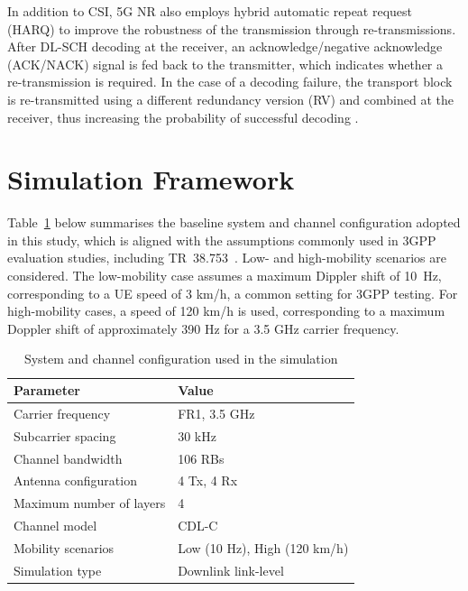 \documentclass[a4paper,12pt,onecolumn]{article}
\begin{document}
	In addition to CSI, 5G NR also employs hybrid automatic repeat request (HARQ) to improve the robustness of the transmission through re-transmissions. After DL-SCH decoding at the receiver, an acknowledge/negative acknowledge (ACK/NACK) signal is fed back to the transmitter, which indicates whether a re-transmission is required. In the case of a decoding failure, the transport block is re-transmitted using a different redundancy version (RV) and combined at the receiver, thus increasing the probability of successful decoding \cite{EricssonBook} \cite{MathWorks2026}.
	
	\section{Simulation Framework}

	Table~\ref{tab:system_config} below summarises the baseline system and channel configuration adopted in this study, which is aligned with the assumptions commonly used in 3GPP evaluation studies, including TR~38.753~\cite{3GPPSimulationSpec}. Low- and high-mobility scenarios are considered. The low-mobility case assumes a maximum Dippler shift of 10~Hz, corresponding to a UE speed of 3 km/h, a common setting for 3GPP testing. For high-mobility cases, a speed of 120 km/h is used, corresponding to a maximum Doppler shift of approximately 390 Hz for a 3.5 GHz carrier frequency.
 
	
	\begin{table}[h]
		\centering
		\caption{System and channel configuration used in the simulation}
		\label{tab:system_config}
		\begin{tabular}{ll}
			\hline
			\textbf{Parameter} & \textbf{Value} \\
			\hline
			Carrier frequency      & FR1, 3.5 GHz \\
			Subcarrier spacing          & 30 kHz \\
			Channel bandwidth           & 106 RBs \\
			Antenna configuration       & 4 Tx, 4 Rx \\
			Maximum number of layers    & 4 \\
			Channel model               & CDL-C \\
			Mobility scenarios          & Low (10 Hz), High (120 km/h)\\
			Simulation type             & Downlink link-level \\
			\hline
		\end{tabular}
	\end{table}
	
\end{document}
